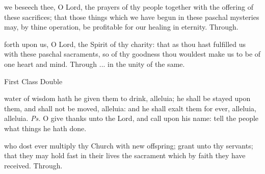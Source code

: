 
\secret
{} we beseech thee, O Lord, the prayers of thy people together with the offering of these sacrifices; that those things which we have begun in these paschal mysteries may, by thine operation, be profitable for our healing in eternity. Through.


\postcommunion
{} forth upon us, O Lord, the Spirit of thy charity: that as thou hast fulfilled us with these paschal sacraments, so of thy goodness thou wouldest make us to be of one heart and mind. Through ... in the unity of the same.

\begin{inhead}
    {First Class Double}
\end{inhead}
\par\noindent
{}


\introit
{} water of wisdom hath he given them to drink, alleluia; he shall be stayed upon them, and shall not be moved, alleluia: and he shall exalt them for ever, alleluia, alleluia. \textit{Ps.} O give thanks unto the Lord, and call upon his name: tell the people what things he hath done.

\collect
 who dost ever multiply thy Church with new offspring; grant unto thy servants; that they may hold fast in their lives the sacrament which by faith they have received. Through.

